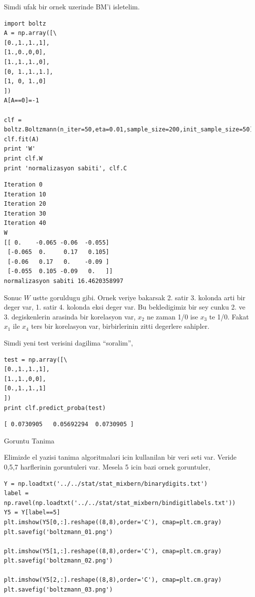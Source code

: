 \documentclass[12pt,fleqn]{article}\usepackage{../common}
\begin{document}
Simdi ufak bir ornek uzerinde BM'i isletelim. 

\begin{verbatim}
import boltz
A = np.array([\
[0.,1.,1.,1],
[1.,0.,0,0],
[1.,1.,1.,0],
[0, 1.,1.,1.],
[1, 0, 1.,0]
])
A[A==0]=-1

clf = boltz.Boltzmann(n_iter=50,eta=0.01,sample_size=200,init_sample_size=50)
clf.fit(A)
print 'W'
print clf.W
print 'normalizasyon sabiti', clf.C
\end{verbatim}

\begin{verbatim}
Iteration 0
Iteration 10
Iteration 20
Iteration 30
Iteration 40
W
[[ 0.    -0.065 -0.06  -0.055]
 [-0.065  0.     0.17   0.105]
 [-0.06   0.17   0.    -0.09 ]
 [-0.055  0.105 -0.09   0.   ]]
normalizasyon sabiti 16.4620358997
\end{verbatim}

Sonuc $W$ ustte goruldugu gibi. Ornek veriye bakarsak 2. satir 3. kolonda
arti bir deger var, 1. satir 4. kolonda eksi deger var. Bu bekledigimiz bir
sey cunku 2. ve 3. degiskenlerin arasinda bir korelasyon var, $x_2$ ne
zaman 1/0 ise $x_3$ te 1/0. Fakat $x_1$ ile $x_4$ ters bir korelasyon var,
birbirlerinin zitti degerlere sahipler. 

Simdi yeni test verisini dagilima ``soralim'', 

\begin{verbatim}
test = np.array([\
[0.,1.,1.,1],
[1.,1.,0,0],
[0.,1.,1.,1]
])    
print clf.predict_proba(test)
\end{verbatim}

\begin{verbatim}
[ 0.0730905   0.05692294  0.0730905 ]
\end{verbatim}

Goruntu Tanima

Elimizde el yazisi tanima algoritmalari icin kullanilan bir veri seti var.
Veride 0,5,7 harflerinin goruntuleri var. Mesela 5 icin bazi ornek
goruntuler,

\begin{verbatim}
Y = np.loadtxt('../../stat/stat_mixbern/binarydigits.txt')
label = np.ravel(np.loadtxt('../../stat/stat_mixbern/bindigitlabels.txt'))
Y5 = Y[label==5]
plt.imshow(Y5[0,:].reshape((8,8),order='C'), cmap=plt.cm.gray)
plt.savefig('boltzmann_01.png')

plt.imshow(Y5[1,:].reshape((8,8),order='C'), cmap=plt.cm.gray)
plt.savefig('boltzmann_02.png')

plt.imshow(Y5[2,:].reshape((8,8),order='C'), cmap=plt.cm.gray)
plt.savefig('boltzmann_03.png')
\end{verbatim}
\end{document}

